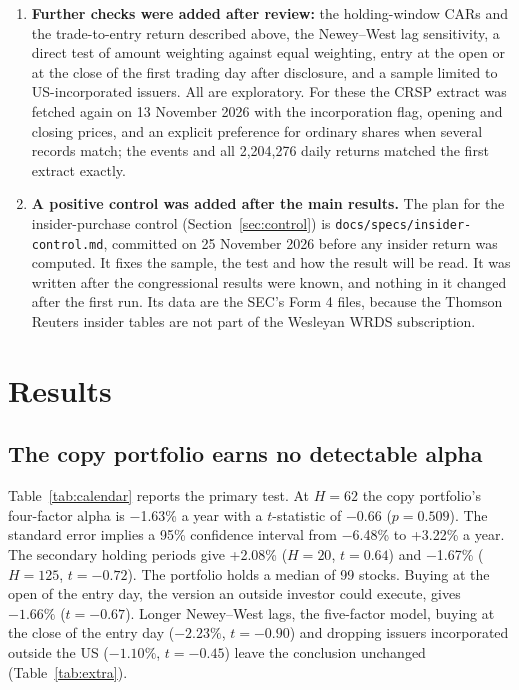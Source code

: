 \documentclass[11pt]{article}
\newcommand{\m}{\ensuremath{-}}
\begin{document}
\begin{enumerate}
\item \textbf{Further checks were added after review:} the holding-window CARs and the trade-to-entry return described above, the Newey--West lag sensitivity, a direct test of amount weighting against equal weighting, entry at the open or at the close of the first trading day after disclosure, and a sample limited to US-incorporated issuers. All are exploratory. For these the CRSP extract was fetched again on 13 November 2026 with the incorporation flag, opening and closing prices, and an explicit preference for ordinary shares when several records match; the events and all 2,204,276 daily returns matched the first extract exactly.
\item \textbf{A positive control was added after the main results.} The plan for the insider-purchase control (Section~\ref{sec:control}) is \texttt{docs/specs/insider-control.md}, committed on 25 November 2026 before any insider return was computed. It fixes the sample, the test and how the result will be read. It was written after the congressional results were known, and nothing in it changed after the first run. Its data are the SEC's Form 4 files, because the Thomson Reuters insider tables are not part of the Wesleyan WRDS subscription.
\end{enumerate}

\section{Results}\label{sec:results}

\subsection{The copy portfolio earns no detectable alpha}

Table~\ref{tab:calendar} reports the primary test. At $H = 62$ the copy portfolio's four-factor alpha is \m1.63\% a year with a $t$-statistic of \m0.66 ($p = 0.509$). The standard error implies a 95\% confidence interval from \m6.48\% to +3.22\% a year. The secondary holding periods give +2.08\% ($H = 20$, $t = 0.64$) and \m1.67\% ($H = 125$, $t = \m0.72$). The portfolio holds a median of 99 stocks. Buying at the open of the entry day, the version an outside investor could execute, gives $\m1.66\%$ ($t = \m0.67$). Longer Newey--West lags, the five-factor model, buying at the close of the entry day ($\m2.23\%$, $t = \m0.90$) and dropping issuers incorporated outside the US ($\m1.10\%$, $t = \m0.45$) leave the conclusion unchanged (Table~\ref{tab:extra}).
\end{document}
